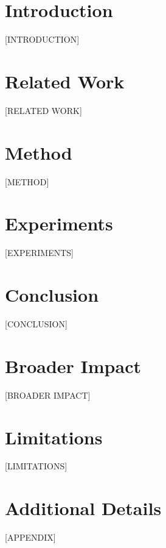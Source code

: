 \documentclass{article}
\theoremstyle{plain}
\theoremstyle{definition}
\theoremstyle{remark}
\begin{document}

\printAffiliationsAndNotice{}

\begin{abstract}
[ABSTRACT]
\end{abstract}

\section{Introduction}
\label{sec:intro}
[INTRODUCTION]

\section{Related Work}
\label{sec:related}
[RELATED WORK]

\section{Method}
\label{sec:method}
[METHOD]

\section{Experiments}
\label{sec:experiments}
[EXPERIMENTS]

\section{Conclusion}
\label{sec:conclusion}
[CONCLUSION]

\section*{Broader Impact}
[BROADER IMPACT]

\section*{Limitations}
[LIMITATIONS]




\appendix
\onecolumn
\section{Additional Details}
[APPENDIX]
\end{document}
